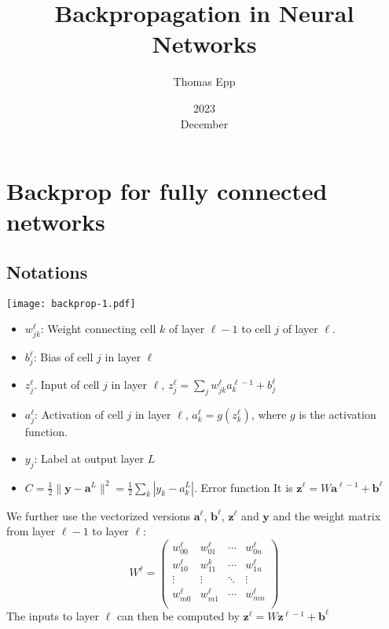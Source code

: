 \documentclass[a4paper,10pt]{article}
\author{Thomas Epp}
\title{Backpropagation in Neural Networks}
\date{2023\\ December}
\newcommand{\vc}[1]{\boldsymbol{#1}}
\begin{document}
\maketitle

\section{Backprop for fully connected networks}

\def\inn{\text{in}}

\subsection{Notations}

\begin{center}
\texttt{[image: backprop-1.pdf]}
\end{center}

\begin{itemize}
    \item $w_{jk}^\ell$: Weight connecting cell $k$ of layer $\ell -1$ to cell $j$ of layer $\ell$.
    \item $b_j^\ell$: Bias of cell $j$ in layer $\ell$
    \item $z_j^\ell$. Input of cell $j$ in layer $\ell$, $z_j^\ell = \sum_j w_{jk}^\ell a_k^{\ell-1} + b_j^\ell$
    \item $a_j^\ell$: Activation of cell $j$ in layer $\ell$, $a_k^{\ell} = g(z_k^\ell)$, where $g$ is the activation function.
    \item $y_j$: Label at output layer $L$
    \item $C=\frac12 \| \vc{y} - \vc{a}^L \|^2 = \frac12 \sum_{k} | y_k - a_k^L |$. Error function
          It is $\vc{z}^{\ell} = W\vc{a}^{\ell-1} + \vc{b}^\ell$
\end{itemize}

We further use the vectorized versions $\vc{a}^\ell$, $\vc{b}^\ell$,
$\vc{z}^\ell$ and $\vc{y}$ and the weight matrix from layer $\ell-1$ to layer
$\ell$:
\[
    W^\ell =
    \begin{pmatrix}
        w_{00}^\ell & w_{01}^\ell & \cdots & w_{0n}^\ell \\
        w_{10}^\ell & w_{11}^k    & \cdots & w_{1n}^\ell \\
        \vdots      & \vdots      & \ddots & \vdots      \\
        w_{m0}^\ell & w_{m1}^\ell & \cdots & w_{mn}^\ell \\
    \end{pmatrix}
\]
The inputs to layer $\ell$ can then be computed by $\vc{z}^\ell =
    W\vc{z}^{\ell-1}+\vc{b}^\ell$
\end{document}
